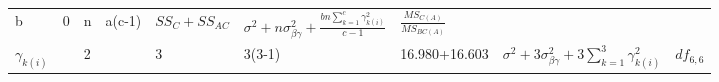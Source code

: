 \documentclass[12pt,]{article}
\begin{document}
\begin{longtable}[]{@{}lllllllll@{}}
\begin{minipage}[t]{0.03\columnwidth}
b\strut
\end{minipage} & \begin{minipage}[t]{0.03\columnwidth}\raggedright
0\strut
\end{minipage} & \begin{minipage}[t]{0.03\columnwidth}\raggedright
n\strut
\end{minipage} & \begin{minipage}[t]{0.12\columnwidth}\raggedright
a(c-1)\strut
\end{minipage} & \begin{minipage}[t]{0.15\columnwidth}\raggedright
\(SS_C+SS_{AC}\)\strut
\end{minipage} & \begin{minipage}[t]{0.21\columnwidth}\raggedright
\(\sigma^2+n\sigma^2_{\beta\gamma}+\frac{bn\sum\limits_{k=1}^c\gamma_{k(i)}^2}{c-1}\)\strut
\end{minipage} & \begin{minipage}[t]{0.09\columnwidth}\raggedright
\(\frac{MS_{C(A)}}{MS_{BC(A)}}\)\strut
\end{minipage}\tabularnewline
\begin{minipage}[t]{0.06\columnwidth}\raggedright
\(\gamma_{k(i)}\)\strut
\end{minipage} & \begin{minipage}[t]{0.03\columnwidth}\raggedright
\strut
\end{minipage} & \begin{minipage}[t]{0.03\columnwidth}\raggedright
2\strut
\end{minipage} & \begin{minipage}[t]{0.03\columnwidth}\raggedright
\strut
\end{minipage} & \begin{minipage}[t]{0.03\columnwidth}\raggedright
3\strut
\end{minipage} & \begin{minipage}[t]{0.12\columnwidth}\raggedright
3(3-1)\strut
\end{minipage} & \begin{minipage}[t]{0.15\columnwidth}\raggedright
16.980+16.603\strut
\end{minipage} & \begin{minipage}[t]{0.21\columnwidth}\raggedright
\(\sigma^2+3\sigma^2_{\beta\gamma}+3\sum\limits_{k=1}^3\gamma_{k(i)}^2\)\strut
\end{minipage} & \begin{minipage}[t]{0.09\columnwidth}\raggedright
\(df_{6,6}\)\strut
\end{minipage}\tabularnewline

\end{longtable}
\end{document}
